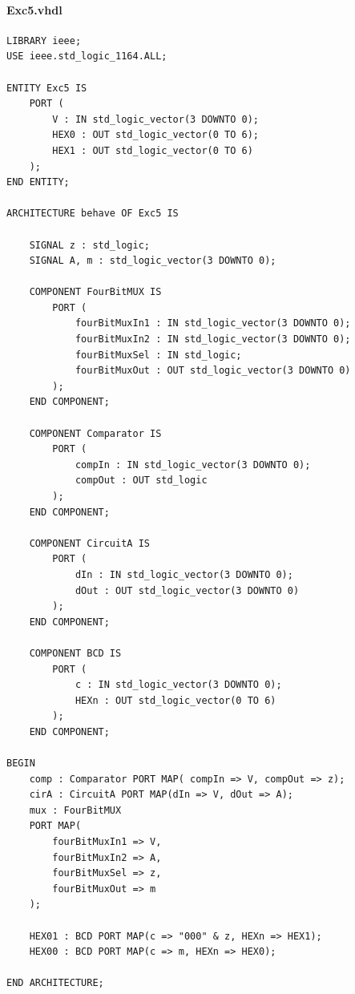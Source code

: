 \documentclass[13pt,a4paper]{report}
\begin{document}
\paragraph{Exc5.vhdl}
\begin{verbatim}
LIBRARY ieee;
USE ieee.std_logic_1164.ALL;

ENTITY Exc5 IS
	PORT (
		V : IN std_logic_vector(3 DOWNTO 0);
		HEX0 : OUT std_logic_vector(0 TO 6);
		HEX1 : OUT std_logic_vector(0 TO 6)
	);
END ENTITY;

ARCHITECTURE behave OF Exc5 IS

	SIGNAL z : std_logic;
	SIGNAL A, m : std_logic_vector(3 DOWNTO 0);

	COMPONENT FourBitMUX IS
		PORT (
			fourBitMuxIn1 : IN std_logic_vector(3 DOWNTO 0);
			fourBitMuxIn2 : IN std_logic_vector(3 DOWNTO 0);
			fourBitMuxSel : IN std_logic;
			fourBitMuxOut : OUT std_logic_vector(3 DOWNTO 0)
		);
	END COMPONENT;
 
	COMPONENT Comparator IS
		PORT (
			compIn : IN std_logic_vector(3 DOWNTO 0);
			compOut : OUT std_logic
		);
	END COMPONENT;

	COMPONENT CircuitA IS
		PORT (
			dIn : IN std_logic_vector(3 DOWNTO 0);
			dOut : OUT std_logic_vector(3 DOWNTO 0)
		);
	END COMPONENT;

	COMPONENT BCD IS
		PORT (
			c : IN std_logic_vector(3 DOWNTO 0);
			HEXn : OUT std_logic_vector(0 TO 6)
		);
	END COMPONENT;
 
BEGIN
	comp : Comparator PORT MAP( compIn => V, compOut => z);
	cirA : CircuitA PORT MAP(dIn => V, dOut => A);
	mux : FourBitMUX
	PORT MAP(
		fourBitMuxIn1 => V, 
		fourBitMuxIn2 => A, 
		fourBitMuxSel => z, 
		fourBitMuxOut => m
	);

	HEX01 : BCD PORT MAP(c => "000" & z, HEXn => HEX1);
	HEX00 : BCD PORT MAP(c => m, HEXn => HEX0);

END ARCHITECTURE;
\end{verbatim}
\end{document}
